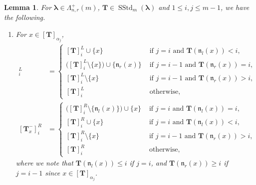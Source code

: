 \documentclass[12pt]{amsart}
\newtheorem{lem}[thm]{Lemma}
\numberwithin{equation}{thm}
\newcommand\bT{\mathbf T}
\newcommand\fn{\mathfrak n}
\renewcommand\a{\alpha}  %
\newcommand\vL{\varLambda}
\newcommand\Bla{\boldsymbol\lambda}
\newcommand{\SStd}{\operatorname{SStd}}
\begin{document}
\begin{lem}
\label{Lemma Tx- iL} 
For $\Bla \in \vL_{n,r}^+(m)$, $\bT \in \SStd_m(\Bla)$ and $1 \leq i,j \leq m-1$, 
we have the following. 
\begin{enumerate} 
\item 
For $x \in [\bT]_{\a_j}$,  
\begin{align*}
[\bT_x^-]_i^L 
	&= \begin{cases}
		[\bT]_i^L \cup\{x\} & \text{ if } j=i \text{ and } \bT(\fn_l(x))< i, 
		\\
		\big( [\bT]_i^L \setminus \{x\} \big) \cup \{ \fn_r (x) \} 
			& \text{ if } j=i-1 \text{ and } \bT(\fn_r(x))=i, 
		\\
		[\bT]_i^L \setminus \{x\} 
			& \text{ if } j=i-1 \text{ and } \bT(\fn_r(x))>i, 
		\\
		[\bT]_i^L 
			& \text{ otherwise}, 
	\end{cases}
\\
[\bT_x^-]_i^R 
	&= \begin{cases}
		\big( [\bT]_i^R \setminus \{\fn_l(x) \} \big) \cup \{x\} 
			& \text{ if } j=i \text{ and } \bT(\fn_l(x)) =i, 
		\\
		[\bT]_i^R \cup \{x\} 
			& \text{ if } j=i \text{ and } \bT(\fn_l(x)) < i, 
		\\
		[\bT]_i^R \setminus \{x\} 
			& \text{ if } j=i-1 \text{ and } \bT(\fn_r(x))>i, 
		\\
		[\bT]_i^R 
			& \text{ otherwise}, 
	\end{cases}
\end{align*}
where we note that 
$\bT(\fn_l(x)) \leq i$ if $j=i$, and $\bT (\fn_r(x)) \geq i$  if $j=i-1$ since $x \in [\bT]_{\a_j} $.


\end{enumerate}
\end{lem}
\end{document}
